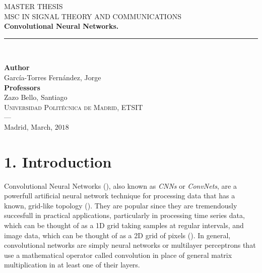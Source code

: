 \documentclass[12pt,a4paper,authoryear]{elsarticle}
\begin{document}
\begin{titlepage}
	
	
	\newlength{\centeroffset}
	\setlength{\centeroffset}{-0.5\oddsidemargin}
	\addtolength{\centeroffset}{0.5\evensidemargin}
	\thispagestyle{empty}
	
	\noindent\hspace*{\centeroffset}\begin{minipage}{\textwidth}
		
		\centering
				
		\textsc{ \large MASTER THESIS\\[0.2cm]}
		\textsc{MSC IN SIGNAL THEORY AND COMMUNICATIONS}\\[1.5cm]
		
		{\LARGE\bfseries Convolutional Neural Networks.\\
		}
		\noindent\rule[-1ex]{\textwidth}{3pt}\\[3.5ex]
		
	\end{minipage}
	
	\vspace{1cm}
	\noindent\hspace*{\centeroffset}\begin{minipage}{\textwidth}
		\centering
		
		\textbf{Author}\\ {García-Torres Fernández, Jorge}\\[2.5ex]
		\textbf{Professors}\\
		{Zazo Bello, Santiago}\\[1.5cm]
		\textsc{Universidad Politécnica de Madrid, ETSIT}\\
		\textsc{---}\\
		Madrid, March, $2018$
	\end{minipage}
\end{titlepage}

\cleardoublepage

\section*{1.  Introduction}

	Convolutional Neural Networks (\cite{lecun1989generalization}), also known as \textit{CNNs} or \textit{ConvNets}, are a powerfull artificial neural network technique for processing data that has a known, grid-like topology (\cite{goodfellow2016deep,deeppython}). They are popular since they are tremendously succesfull in practical applications, particularly in processing time series data, which can be thought of as a 1D grid taking samples at regular intervals, and image data, which can be thought of as a 2D grid of pixels (\cite{goodfellow2016deep}). In general, convolutional networks are simply neural networks or multilayer perceptrons that use a mathematical operator called convolution in place of general matrix multiplication in at least one of their layers.
	
\end{document}
